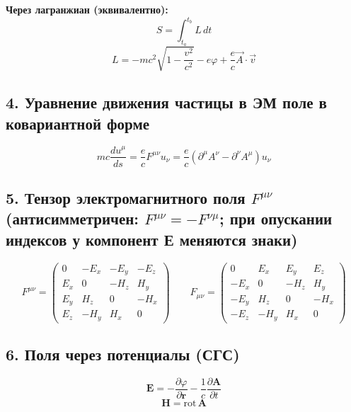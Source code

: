 \documentclass[10pt]{article}
\begin{document}
\textbf{Через лагранжиан (эквивалентно):}
$$S = \int_{t_a}^{t_b} L\, dt$$
$$L = -mc^2\sqrt{1-\frac{v^2}{c^2}} - e\varphi + \frac{e}{c}\vec{A}\cdot\vec{v}$$


\subsection*{4. Уравнение движения частицы в ЭМ поле в ковариантной форме}
$$mc\frac{du^\mu}{ds} = \frac{e}{c}F^{\mu\nu}u_\nu = \frac{e}{c}\left(\partial^\mu A^\nu - \partial^\nu A^\mu\right)u_\nu$$

\subsection*{5. Тензор электромагнитного поля $F^{\mu\nu}$ (антисимметричен: $F^{\mu\nu} = -F^{\nu\mu}$; при опускании индексов у компонент Е меняются знаки)}
$$F^{\mu\nu} = \begin{pmatrix} 0 & -E_x & -E_y & -E_z \\ E_x & 0 & -H_z & H_y \\ E_y & H_z & 0 & -H_x \\ E_z & -H_y & H_x & 0 \end{pmatrix} \qquad F_{\mu\nu} = \begin{pmatrix} 0 & E_x & E_y & E_z \\ -E_x & 0 & -H_z & H_y \\ -E_y & H_z & 0 & -H_x \\ -E_z & -H_y & H_x & 0 \end{pmatrix}$$

\subsection*{6. Поля через потенциалы (СГС)}
$$\mathbf{E} = -\frac{\partial\varphi}{\partial\mathbf{r}} - \frac{1}{c}\frac{\partial\mathbf{A}}{\partial t}$$
$$\mathbf{H} = \text{rot}\,\mathbf{A} $$
\end{document}
